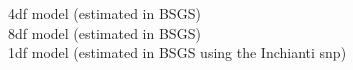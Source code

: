 \documentclass[paper=a4, fontsize=11pt]{scrartcl}					%
\numberwithin{equation}{section}									%
\numberwithin{figure}{section}										%
\numberwithin{table}{section}										%
\begin{document}
4df model (estimated in BSGS) \\
8df model (estimated in BSGS) \\
1df model (estimated in BSGS using the Inchianti snp) \\

















\end{document}
